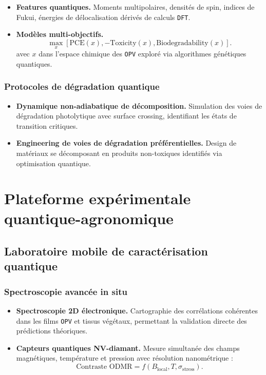 \documentclass[12pt, a4paper]{article}
\begin{document}
\begin{itemize}
    \item \textbf{Features quantiques.} Moments multipolaires, densités de spin, indices de Fukui, énergies de délocalisation dérivés de calculs \texttt{DFT}.
    
    \item \textbf{Modèles multi-objectifs.}
    \begin{equation}
    \max_{x} [\text{PCE}(x), -\text{Toxicity}(x), \text{Biodegradability}(x)].
    \end{equation}
    avec $x$ dans l'espace chimique des \texttt{OPV} exploré via algorithmes génétiques quantiques.
\end{itemize}

\subsubsection{Protocoles de dégradation quantique}

\begin{itemize}
    \item \textbf{Dynamique non-adiabatique de décomposition.} Simulation des voies de dégradation photolytique avec surface crossing, identifiant les états de transition critiques.
    
    \item \textbf{Engineering de voies de dégradation préférentielles.} Design de matériaux se décomposant en produits non-toxiques identifiés via optimisation quantique.
\end{itemize}

\section{Plateforme expérimentale quantique-agronomique}

\subsection{Laboratoire mobile de caractérisation quantique}

\subsubsection{Spectroscopie avancée in situ}

\begin{itemize}
    \item \textbf{Spectroscopie 2D électronique.} Cartographie des corrélations cohérentes dans les films \texttt{OPV} et tissus végétaux, permettant la validation directe des prédictions théoriques.
    
    \item \textbf{Capteurs quantiques NV-diamant.} Mesure simultanée des champs magnétiques, température et pression avec résolution nanométrique :
    \begin{equation}
    \text{Contraste ODMR} = f(B_{\text{local}}, T, \sigma_{\text{stress}}).
    \end{equation}
\end{itemize}
\end{document}
